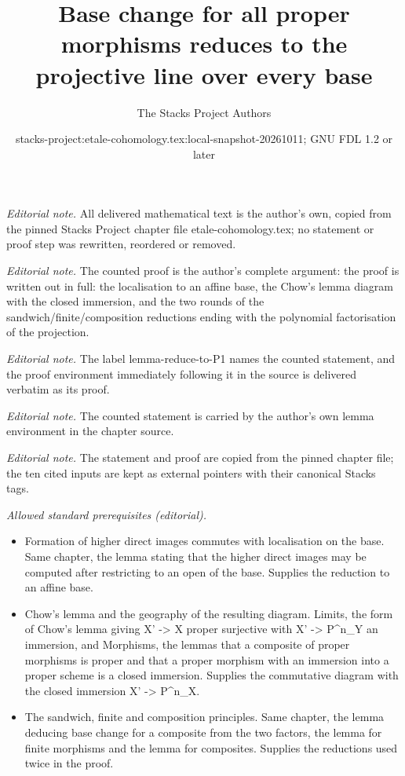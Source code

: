 \documentclass[10pt,a4paper]{amsart}
\title{Base change for all proper morphisms reduces to the projective line over every base}
\author{The Stacks Project Authors}
\date{stacks-project:etale-cohomology.tex:local-snapshot-20261011; GNU FDL 1.2 or later}
\theoremstyle{plain}
\theoremstyle{definition}
\theoremstyle{remark}
\numberwithin{equation}{subsection}
\begin{document}
\maketitle
\noindent\textit{Editorial note.} All delivered mathematical text is the author's own, copied from the pinned Stacks Project chapter file etale-cohomology.tex; no statement or proof step was rewritten, reordered or removed.\par\medskip
\noindent\textit{Editorial note.} The counted proof is the author's complete argument: the proof is written out in full: the localisation to an affine base, the Chow's lemma diagram with the closed immersion, and the two rounds of the sandwich/finite/composition reductions ending with the polynomial factorisation of the projection.\par\medskip
\noindent\textit{Editorial note.} The label lemma-reduce-to-P1 names the counted statement, and the proof environment immediately following it in the source is delivered verbatim as its proof.\par\medskip
\noindent\textit{Editorial note.} The counted statement is carried by the author's own lemma environment in the chapter source.\par\medskip
\noindent\textit{Editorial note.} The statement and proof are copied from the pinned chapter file; the ten cited inputs are kept as external pointers with their canonical Stacks tags.\par\medskip
\noindent\textit{Allowed standard prerequisites (editorial).}\begin{itemize}
\item Formation of higher direct images commutes with localisation on the base. Same chapter, the lemma stating that the higher direct images may be computed after restricting to an open of the base. Supplies the reduction to an affine base.
\item Chow's lemma and the geography of the resulting diagram. Limits, the form of Chow's lemma giving X' -> X proper surjective with X' -> P\textasciicircum{}n\_Y an immersion, and Morphisms, the lemmas that a composite of proper morphisms is proper and that a proper morphism with an immersion into a proper scheme is a closed immersion. Supplies the commutative diagram with the closed immersion X' -> P\textasciicircum{}n\_X.
\item The sandwich, finite and composition principles. Same chapter, the lemma deducing base change for a composite from the two factors, the lemma for finite morphisms and the lemma for composites. Supplies the reductions used twice in the proof.
\end{itemize}\medskip
\end{document}
